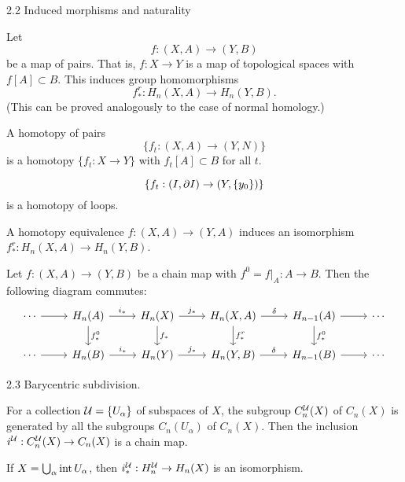 2.2 Induced morphisms and naturality

\begin{defn}
  Let
  \[ f: (X,A) \to (Y,B) \]
  be a map of pairs.
  That is, $f:X \to Y$ is a map of topological spaces with $f[A] \subset B$.
  This induces group homomorphisms
  \[ f_*^r: H_n(X,A) \to H_n(Y,B). \]
  (This can be proved analogously to the case of normal homology.)
\end{defn}

\begin{defn}
  A homotopy of pairs
  \[ \{ f_t: (X,A) \to (Y,N) \} \]
  is a homotopy $\{ f_t: X \to Y \}$ with $f_t[A] \subset B$ for all $t$.
\end{defn}

\begin{exam}
  \[ \{ f_t: (I, \partial I) \to (Y, \{y_0\}) \} \]
  is a homotopy of loops.
\end{exam}

\begin{rmk}
  A homotopy equivalence $f: (X,A) \to (Y,A)$ induces an isomorphism $f_*^r: H_n(X,A) \to H_n(Y,B)$.
\end{rmk}

\begin{rmk}[Naturality]
  Let $f: (X,A) \to (Y,B)$ be a chain map with $f^0 = f|_A: A \to  B$.
  Then the following diagram commutes:
  \begin{equation*}
    \begin{tikzcd}
      \cdots \ar[r] & H_n(A) \ar[d, "f_*^0"] \ar[r, "i_*"] & H_n(X) \ar[d, "f_*"] \ar[r, "j_*"] & H_n(X,A) \ar[d, "f_*^r"] \ar[r, "\delta"] & H_{n-1}(A) \ar[d, "f_*^0"] \ar[r] & \cdots \\
      \cdots \ar[r] & H_n(B) \ar[r, "i_*"] & H_n(Y) \ar[r, "j_*"] & H_n(Y,B) \ar[r, "\delta"] & H_{n-1}(B) \ar[r] & \cdots
    \end{tikzcd}
  \end{equation*}
\end{rmk}

2.3 Barycentric subdivision.

\begin{defn}
  For a collection $\mathcal{U} = \{U_\alpha\}$ of subspaces of $X$, the subgroup $C_n^{\mathcal{U}}(X)$ of $C_n(X)$ is generated by all the subgroups $C_n(U_\alpha)$ of $C_n(X)$.
  Then the inclusion $i^{\mathcal{U}}: C_n^{\mathcal{U}}(X) \to C_n(X)$ is a chain map.
\end{defn}

\begin{prop}
  If $X = \bigcup_\alpha \operatorname{int} U_\alpha$, then $i_*^{\mathcal{U}}: H_n^{\mathcal{U}} \to H_n(X)$ is an isomorphism.
\end{prop}

